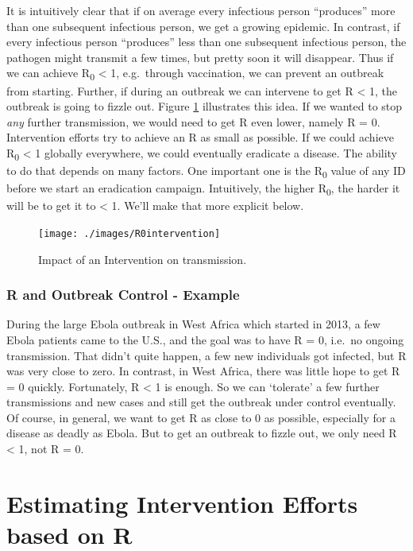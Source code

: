\documentclass[
]{book}
\begin{document}
It is intuitively clear that if on average every infectious person ``produces'' more than one subsequent infectious person, we get a growing epidemic. In contrast, if every infectious person ``produces'' less than one subsequent infectious person, the pathogen might transmit a few times, but pretty soon it will disappear. Thus if we can achieve R\textsubscript{0} \textless{} 1, e.g.~through vaccination, we can prevent an outbreak from starting. Further, if during an outbreak we can intervene to get R \textless{} 1, the outbreak is going to fizzle out. Figure \ref{fig:R0intervention} illustrates this idea. If we wanted to stop \emph{any} further transmission, we would need to get R even lower, namely R = 0. Intervention efforts try to achieve an R as small as possible. If we could achieve R\textsubscript{0} \textless{} 1 globally everywhere, we could eventually eradicate a disease. The ability to do that depends on many factors. One important one is the R\textsubscript{0} value of any ID before we start an eradication campaign. Intuitively, the higher R\textsubscript{0}, the harder it will be to get it to \textless{} 1. We'll make that more explicit below.

\begin{figure}
\texttt{[image: ./images/R0intervention]} \caption{Impact of an Intervention on transmission.}\label{fig:R0intervention}
\end{figure}

\hypertarget{myexamplebox}{%
\subsubsection{R and Outbreak Control - Example}\label{myexamplebox}}

During the large Ebola outbreak in West Africa which started in 2013, a few Ebola patients came to the U.S., and the goal was to have R = 0, i.e.~no ongoing transmission. That didn't quite happen, a few new individuals got infected, but R was very close to zero. In contrast, in West Africa, there was little hope to get R = 0 quickly. Fortunately, R \textless{} 1 is enough. So we can `tolerate' a few further transmissions and new cases and still get the outbreak under control eventually. Of course, in general, we want to get R as close to 0 as possible, especially for a disease as deadly as Ebola. But to get an outbreak to fizzle out, we only need R \textless{} 1, not R = 0.

\hypertarget{estimating-intervention-efforts-based-on-r}{%
\section{Estimating Intervention Efforts based on R}\label{estimating-intervention-efforts-based-on-r}}
\end{document}
